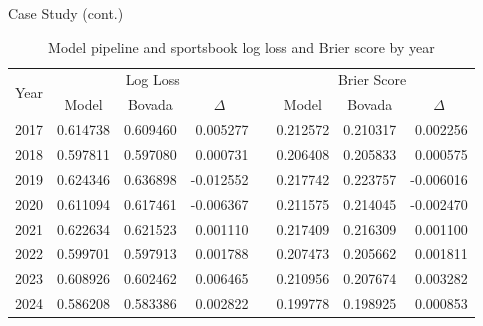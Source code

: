 \documentclass[aspectratio=169,xcolor=dvipsnames]{beamer}
\begin{document}

\begin{frame}{Case Study (cont.)}
    \tiny
    \begin{table}[!htb]
    \centering
    \begin{tabular}{@{}cccrcccr@{}}
    \toprule
    \multirow{2}{*}{Year} & \multicolumn{3}{c}{Log Loss}                                                               & \multirow{2}{*}{}    & \multicolumn{3}{c}{Brier Score}                    \\ \cmidrule(lr){2-4} \cmidrule(l){6-8} 
                          & Model                        & Bovada                       & \multicolumn{1}{c}{$\Delta$} &                      & Model    & Bovada   & \multicolumn{1}{c}{$\Delta$} \\ \midrule
    2017                  & 0.614738                     & 0.609460                     & 0.005277                     &                      & 0.212572 & 0.210317 & 0.002256                     \\
    2018                  & \multicolumn{1}{l}{0.597811} & \multicolumn{1}{l}{0.597080} & 0.000731                     & \multicolumn{1}{l}{} & 0.206408 & 0.205833 & 0.000575                     \\
    2019                  & 0.624346                     & 0.636898                     & -0.012552                    &                      & 0.217742 & 0.223757 & -0.006016                    \\
    2020                  & 0.611094                     & 0.617461                     & -0.006367                    &                      & 0.211575 & 0.214045 & -0.002470                    \\
    2021                  & 0.622634                     & 0.621523                     & 0.001110                     &                      & 0.217409 & 0.216309 & 0.001100                     \\
    2022                  & 0.599701                     & 0.597913                     & 0.001788                     &                      & 0.207473 & 0.205662 & 0.001811                     \\
    2023                  & 0.608926                     & 0.602462                     & 0.006465                     &                      & 0.210956 & 0.207674 & 0.003282                     \\
    2024                  & 0.586208                     & 0.583386                     & 0.002822                     &                      & 0.199778 & 0.198925 & 0.000853                     \\ \bottomrule
    \end{tabular}
    \normalsize
    \caption{Model pipeline and sportsbook log loss and Brier score by year}
    \label{case_study_by_year}
    \end{table}


\end{frame}
\end{document}
